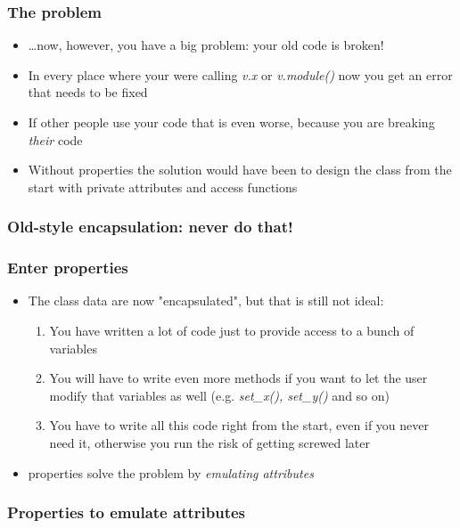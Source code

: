 \documentclass[9pt]{beamer}
\begin{document}
\begin{frame}
  \frametitle{The problem}
  \begin{itemize}
    \item \dots now, however, you have a big problem: your old code is broken!
    \medskip
    \item In every place where your were calling \emph{v.x} or \emph{v.module()}
          now you get an error that needs to be fixed
    \medskip
    \item If other people use your code that is even worse, because you are breaking \emph{their} code
    \medskip
    \item Without properties the solution would have been to design the class from
          the start with private attributes and access functions
  \end{itemize}
\end{frame}


\begin{frame}
  \frametitle{Old-style encapsulation: never do that!}
  
\end{frame}

\begin{frame}
\frametitle{Enter properties}
  \begin{itemize}
    \item The class data are now "encapsulated", but that is still not ideal:
    \medskip
    \begin{enumerate}
    \item You have written a lot of code just to provide access to a bunch of
          variables
    \medskip
    \item You will have to write even more methods if you want to let the user
          modify that variables as well (e.g. \emph{set\_x(), set\_y()} and so on)
    \medskip
    \item You have to write all this code right from the start, even if you
          never need it, otherwise you run the risk of getting screwed later
    \end{enumerate}
    \medskip
    \item \alert{properties} solve the problem by \emph{emulating attributes}
  \end{itemize}
\end{frame}


\begin{frame}
  \frametitle{Properties to emulate attributes}
  
\end{frame}
\end{document}
